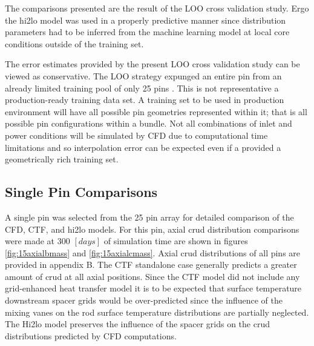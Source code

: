 The comparisons presented are the result of the LOO cross validation study.
Ergo the hi2lo model was used in a properly predictive manner since distribution parameters had to be inferred from the machine learning model at local core conditions outside of the training set.

The error estimates provided by the present LOO cross validation study can be viewed as conservative.  The LOO strategy expunged an entire pin from an already limited training pool of only 25 pins . This is not representative a production-ready training data set.  A training set to be used in production environment will have all possible pin geometries represented within it; that is all possible pin configurations within a bundle.  Not all combinations of inlet and power conditions will be simulated by CFD due to computational time limitations and so interpolation error can be expected even if a provided a geometrically rich training set.  




\subsection{Single Pin Comparisons}
\label{sec:single_pin_result}

A single pin was selected from the 25 pin array for detailed comparison of the CFD, CTF, and hi2lo models.  For this pin, axial crud distribution comparisons were made at 300 $[days]$ of simulation time are shown in figures \ref{fig:15axialbmass} and \ref{fig:15axialcmass}.  Axial crud distributions of all pins are provided in appendix B.  The CTF standalone case generally predicts a greater amount of crud at all axial positions.  Since the CTF model did not include any grid-enhanced heat transfer model it is to be expected that surface temperature downstream spacer grids would be over-predicted since the influence of the mixing vanes on the rod surface temperature distributions are partially neglected.  The Hi2lo model preserves the influence of the spacer grids on the crud distributions predicted by CFD computations.

